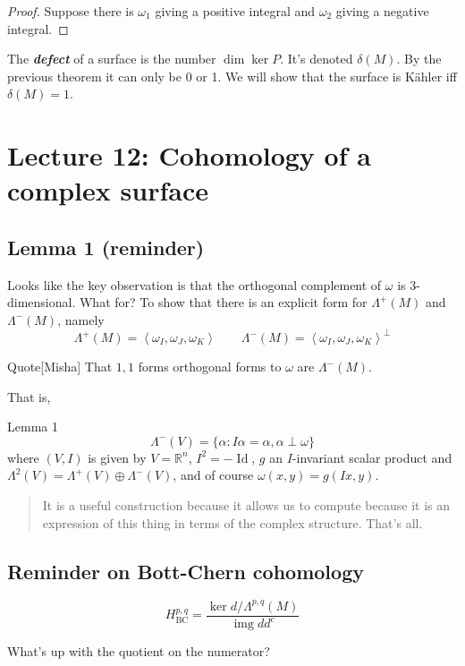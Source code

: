 \begin{proof}\leavevmode
Suppose there is \(\omega_1\) giving a positive integral and \(\omega_2\) giving a negative integral. 
\end{proof}

\begin{defn}\leavevmode
The \textit{\textbf{defect}} of a surface  is the number \(\dim \ker P\). It's denoted \(\delta(M)\). By the previous theorem it can only be 0 or 1. We will show that the surface is  Kähler iff \(\delta(M)=1\).
\end{defn}

\section{Lecture 12: Cohomology of a complex surface}

\subsection{Lemma 1 (reminder)}

Looks like the key observation is that the orthogonal complement of \(\omega\) is 3-dimensional. What for? To show that there is an explicit form for \(\Lambda^{+}(M)\) and \(\Lambda^{-}(M)\), namely
\[\Lambda^{+}(M)=\left<\omega_I,\omega_J,\omega_K\right>\qquad \Lambda^{-}(M)=\left<\omega_I,\omega_J,\omega_K\right>^\perp\]
\begin{thing6}{Quote}[Misha]\leavevmode
That \(1,1\) forms orthogonal forms to \(\omega\) are \(\Lambda^{-}(M)\).
\end{thing6}
That is,
\begin{thing5}{Lemma 1}\leavevmode
\[\Lambda^{-}(V)=\{\alpha:I\alpha=\alpha,\alpha \perp \omega\}\]
where \((V,I)\) is given by \(V=\mathbb{R}^n\), \(I^2=-\operatorname{Id}\), \(g\) an \(I\)-invariant scalar product and \(\Lambda^{2}(V)=\Lambda^{+}(V)\oplus \Lambda^{-}(V)\), and of course \(\omega(x,y)=g(Ix,y)\).
\end{thing5}

\begin{quotation}
	It is a useful construction because it allows us to compute because it is an expression of this thing in terms of the complex structure. That's all.
\end{quotation}

\subsection{Reminder on Bott-Chern cohomology}
\[H^{p,q}_{\operatorname{BC}}=\frac{\ker d\Big/ \Lambda^{p,q}(M)}{\operatorname{img} d d ^c}\]
\begin{question}\leavevmode
What's up with the quotient on the numerator?
\end{question}

